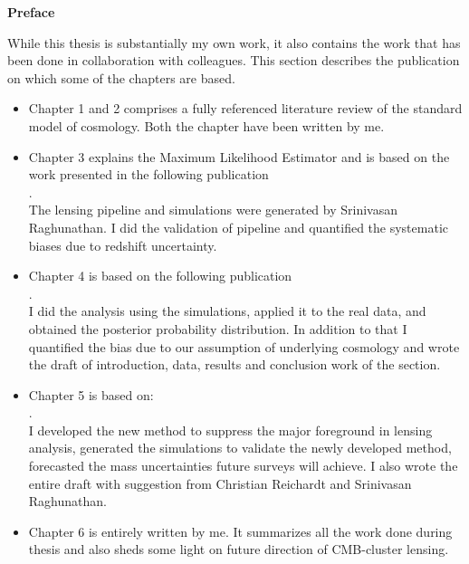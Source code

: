 \bfseries{Preface}\mdseries\\                                                                                                
\vspace{0.5cm}                                                                                                                                  
                                                                                            
While this thesis is substantially my own work, it also contains the work that has been done in collaboration with colleagues. 
This section describes the publication on which some of the chapters are based.

\begin{itemize}
\item Chapter 1 and 2 comprises a fully referenced literature review of the standard model of cosmology. Both the chapter have been written by me.
\item Chapter 3 explains the Maximum Likelihood Estimator and is based on the work presented in the following publication\\ 
\citet*{raghunathan17a}. \\The lensing pipeline and simulations were generated by Srinivasan Raghunathan. I did the validation of pipeline and quantified the systematic biases due to redshift uncertainty.
\item Chapter 4 is based on the following publication\\ \citet*{raghunathan18}. \\I did the analysis using the simulations, applied it to the real data, and obtained the posterior probability distribution. In addition to that I quantified the bias due to our assumption of underlying cosmology and wrote the draft of introduction, data, results and conclusion work of the section.  
\item Chapter 5 is based on:\\ \citet*{patil19}.
\\ I developed the new method to suppress the major foreground in lensing analysis, generated the simulations to validate the newly developed method, forecasted the mass uncertainties future surveys will achieve. I also wrote the entire draft with suggestion from Christian Reichardt and Srinivasan Raghunathan.
\item Chapter 6 is entirely written by me. It summarizes all the work done during thesis and also sheds some light on future direction of CMB-cluster lensing.
\end{itemize}

